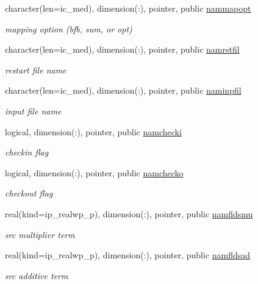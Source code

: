 \begin{DoxyCompactItemize}
character(len=ic\+\_\+med), dimension(\+:), pointer, public \hyperlink{namespacemod__oasis__namcouple_ad2554b4881fa63780dd5e6fe78d705ef}{nammapopt}
\begin{DoxyCompactList}\small\item\em mapping option (bfb, sum, or opt) \end{DoxyCompactList}\item 
character(len=ic\+\_\+med), dimension(\+:), pointer, public \hyperlink{namespacemod__oasis__namcouple_a54f4b8262f809a20928092782bc78345}{namrstfil}
\begin{DoxyCompactList}\small\item\em restart file name \end{DoxyCompactList}\item 
character(len=ic\+\_\+med), dimension(\+:), pointer, public \hyperlink{namespacemod__oasis__namcouple_a15fc11ff1c1d5718ff127a06a205a82c}{naminpfil}
\begin{DoxyCompactList}\small\item\em input file name \end{DoxyCompactList}\item 
logical, dimension(\+:), pointer, public \hyperlink{namespacemod__oasis__namcouple_a7c88a329c97aea020e9b135bdca8d160}{namchecki}
\begin{DoxyCompactList}\small\item\em checkin flag \end{DoxyCompactList}\item 
logical, dimension(\+:), pointer, public \hyperlink{namespacemod__oasis__namcouple_a58c011820e55c9af9f306fbb1d45eb23}{namchecko}
\begin{DoxyCompactList}\small\item\em checkout flag \end{DoxyCompactList}\item 
real(kind=ip\+\_\+realwp\+\_\+p), dimension(\+:), pointer, public \hyperlink{namespacemod__oasis__namcouple_ab52824ec91491253e02556a68ab31b09}{namfldsmu}
\begin{DoxyCompactList}\small\item\em src multiplier term \end{DoxyCompactList}\item 
real(kind=ip\+\_\+realwp\+\_\+p), dimension(\+:), pointer, public \hyperlink{namespacemod__oasis__namcouple_a1729dba99742412a1e07a479cb7f7921}{namfldsad}
\begin{DoxyCompactList}\small\item\em src additive term \end{DoxyCompactList}\item 

\end{DoxyCompactItemize}
